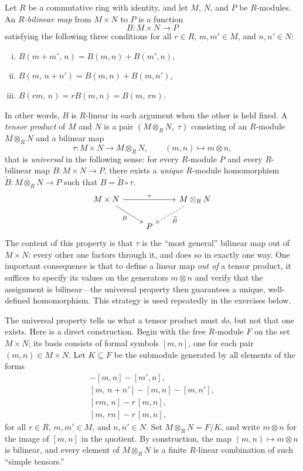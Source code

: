 \documentclass[12pt,reqno]{amsart}
\begin{document}
Let $R$ be a commutative ring with identity, and let $M$, $N$, and $P$ be $R$-modules.  An \emph{$R$-bilinear map} from $M\times N$ to $P$ is a function
\[
B\colon M\times N\to P
\]
satisfying the following three conditions for all $r\in R$, $m,m'\in M$, and $n,n'\in N$:
\begin{enumerate}[(i)]
\item $B(m+m',\,n)=B(m,n)+B(m',n)$,
\item $B(m,\,n+n')=B(m,n)+B(m,n')$,
\item $B(rm,\,n)=rB(m,n)=B(m,\,rn)$.
\end{enumerate}
In other words, $B$ is $R$-linear in each argument when the other is held fixed. A \emph{tensor product} of $M$ and $N$ is a pair $(M\otimes_R N,\;\tau)$ consisting of an $R$-module $M\otimes_R N$ and a bilinear map
\[
\tau\colon M\times N\to M\otimes_R N,
\qquad
(m,n)\longmapsto m\otimes n,
\]
that is \emph{universal} in the following sense: for every $R$-module $P$ and every $R$-bilinear map $B\colon M\times N\to P$, there exists a \emph{unique} $R$-module homomorphism $\widetilde{B}\colon M\otimes_R N\to P$ such that $B=\widetilde{B}\circ\tau$.
\[
\begin{tikzcd}
M\times N \arrow[rr,"\tau"] \arrow[dr,"B"'] & & M\otimes_R N \arrow[dl,dashed,"\widetilde{B}"] \\
& P &
\end{tikzcd}
\]
The content of this property is that $\tau$ is the ``most general'' bilinear map out of $M\times N$: every other one factors through it, and does so in exactly one way. One important consequence is that to define a linear map \emph{out of} a tensor product, it suffices to specify its values on the generators $m\otimes n$ and verify that the assignment is bilinear---the universal property then guarantees a unique, well-defined homomorphism. This strategy is used repeatedly in the exercises below.

The universal property tells us what a tensor product must \emph{do}, but not that one exists. Here is a direct construction. Begin with the free $R$-module $F$ on the set $M\times N$; its basis consists of formal symbols $[m,n]$, one for each pair $(m,n)\in M\times N$. Let $K\subseteq F$ be the submodule generated by all elements of the forms
\begin{align*}
[m+m',\,n]-[m,n]-[m',n],\\
[m,\,n+n']-[m,n]-[m,n'],\\
[rm,\,n]-r\,[m,n],\\
[m,\,rn]-r\,[m,n],
\end{align*}
for all $r\in R$, $m,m'\in M$, and $n,n'\in N$.  Set $M\otimes_R N=F/K$, and write $m\otimes n$ for the image of $[m,n]$ in the quotient. By construction, the map $(m,n)\mapsto m\otimes n$ is bilinear, and every element of $M\otimes_R N$ is a finite $R$-linear combination of such ``simple tensors.''
 
\end{document}
